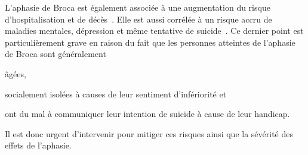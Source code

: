 L'aphasie de Broca est également associée à une augmentation du risque d'hospitalisation 
et de décès~\cite{Flowers_Skoretz_Silver_Rochon_Fang_Flamand-Roze_Martino_2016}.
Elle est aussi corrélée à un risque accru de maladies mentales, 
dépression et même tentative de suicide~\cite{Morrison_2016,Costanza_et_al._2021}.
Ce dernier point est particulièrement grave en raison du fait que 
les personnes atteintes de l'aphasie de Broca sont généralement
\begin{enumerate*}[label=(\arabic*)]
    \item âgées, 
    \item socialement isolées à causes de leur sentiment d'infériorité et 
    \item ont du mal à communiquer leur intention de suicide à cause de leur handicap.
\end{enumerate*}
Il est donc urgent d'intervenir pour mitiger ces risques ainsi que la sévérité des effets de l'aphasie.